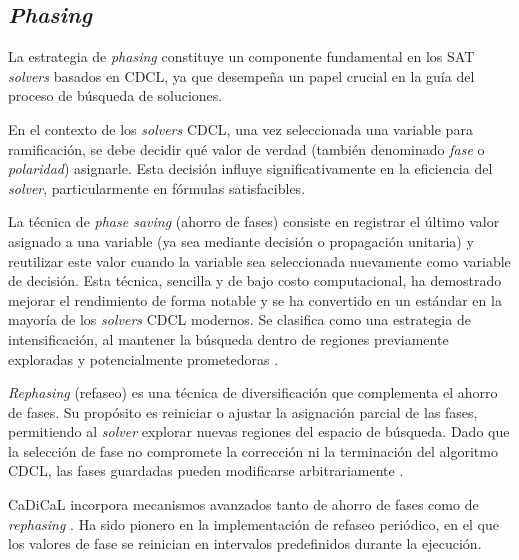 \subsection{\textit{Phasing}}
\label{subsec:cadical-phasing}
La estrategia de \textit{phasing} constituye un componente fundamental en los SAT \textit{solvers} basados en CDCL, ya que desempeña un papel crucial en la guía del proceso de búsqueda de soluciones.

En el contexto de los \textit{solvers} CDCL, una vez seleccionada una variable para ramificación, se debe decidir qué valor de verdad (también denominado \textit{fase} o \textit{polaridad}) asignarle. Esta decisión influye significativamente en la eficiencia del \textit{solver}, particularmente en fórmulas satisfacibles.

La técnica de \textit{phase saving} (ahorro de fases) consiste en registrar el último valor asignado a una variable (ya sea mediante decisión o propagación unitaria) y reutilizar este valor cuando la variable sea seleccionada nuevamente como variable de decisión. Esta técnica, sencilla y de bajo costo computacional, ha demostrado mejorar el rendimiento de forma notable y se ha convertido en un estándar en la mayoría de los \textit{solvers} CDCL modernos. Se clasifica como una estrategia de intensificación, al mantener la búsqueda dentro de regiones previamente exploradas y potencialmente prometedoras \cite{cai2022better_heuristics}.

\textit{Rephasing} (refaseo) es una técnica de diversificación que complementa el ahorro de fases. Su propósito es reiniciar o ajustar la asignación parcial de las fases, permitiendo al \textit{solver} explorar nuevas regiones del espacio de búsqueda. Dado que la selección de fase no compromete la corrección ni la terminación del algoritmo CDCL, las fases guardadas pueden modificarse arbitrariamente \cite{cai2022better_heuristics}.

CaDiCaL incorpora mecanismos avanzados tanto de ahorro de fases como de \textit{rephasing} \cite{cadical2024}.
Ha sido pionero en la implementación de refaseo periódico, en el que los valores de fase se reinician en intervalos predefinidos durante la ejecución. 



